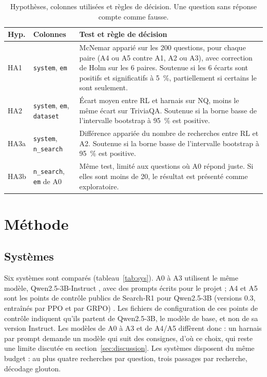 \documentclass[11pt,a4paper]{article}
\begin{document}
\begin{table}[ht]
\centering\small
\begin{tabular}{@{}lp{3.5cm}p{8.6cm}@{}}
\toprule
Hyp. & Colonnes & Test et règle de décision\\
\midrule
HA1 & \texttt{system}, \texttt{em} & McNemar apparié sur les 200 questions, pour chaque paire (A4 ou A5 contre A1, A2 ou A3), avec correction de Holm sur les 6 paires. Soutenue si les 6 écarts sont positifs et significatifs à 5~\%, partiellement si certains le sont seulement.\\
HA2 & \texttt{system}, \texttt{em}, \texttt{dataset} & Écart moyen entre RL et harnais sur NQ, moins le même écart sur TriviaQA. Soutenue si la borne basse de l'intervalle bootstrap à 95~\% est positive.\\
HA3a & \texttt{system}, \texttt{n\_search} & Différence appariée du nombre de recherches entre RL et A2. Soutenue si la borne basse de l'intervalle bootstrap à 95~\% est positive.\\
HA3b & \texttt{n\_search}, \texttt{em} de A0 & Même test, limité aux questions où A0 répond juste. Si elles sont moins de 20, le résultat est présenté comme exploratoire.\\
\bottomrule
\end{tabular}
\caption{Hypothèses, colonnes utilisées et règles de décision. Une question sans réponse compte comme fausse.}
\label{tab:test}
\end{table}

\section{Méthode}\label{sec:methode}

\subsection{Systèmes}
Six systèmes sont comparés (tableau~\ref{tab:sys}). A0 à A3 utilisent le même modèle, Qwen2.5-3B-Instruct \citep{qwen2024qwen2}, avec des prompts écrits pour le projet ; A4 et A5 sont les points de contrôle publics de Search-R1 pour Qwen2.5-3B (versions 0.3, entraînés par PPO et par GRPO) \citep{jin2025search}. Les fichiers de configuration de ces points de contrôle indiquent qu'ils partent de Qwen2.5-3B, le modèle de base, et non de sa version Instruct. Les modèles de A0 à A3 et de A4/A5 diffèrent donc : un harnais par prompt demande un modèle qui suit des consignes, d'où ce choix, qui reste une limite discutée en section~\ref{sec:discussion}. Les systèmes disposent du même budget : au plus quatre recherches par question, trois passages par recherche, décodage glouton.
\end{document}
